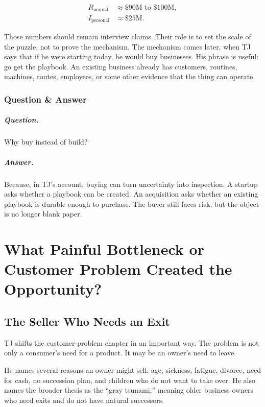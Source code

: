 \documentclass[11pt,oneside]{book}
\begin{document}
\begin{align}
R_{\mathrm{annual}} &\approx \$90\mathrm{M}\text{ to }\$100\mathrm{M},\\
I_{\mathrm{personal}} &\approx \$25\mathrm{M}.
\end{align}

Those numbers should remain interview claims. Their role is to set the scale of the puzzle, not to prove the mechanism. The mechanism comes later, when TJ says that if he were starting today, he would buy businesses. His phrase is useful: go get the playbook. An existing business already has customers, routines, machines, routes, employees, or some other evidence that the thing can operate.

\subsection{Question \& Answer}

\paragraph{Question.}
Why buy instead of build?

\paragraph{Answer.}
Because, in TJ's account, buying can turn uncertainty into inspection. A startup asks whether a playbook can be created. An acquisition asks whether an existing playbook is durable enough to purchase. The buyer still faces risk, but the object is no longer blank paper.

\chapter{What Painful Bottleneck or Customer Problem Created the Opportunity?}

\section{The Seller Who Needs an Exit}

TJ shifts the customer-problem chapter in an important way. The problem is not only a consumer's need for a product. It may be an owner's need to leave.

He names several reasons an owner might sell: age, sickness, fatigue, divorce, need for cash, no succession plan, and children who do not want to take over. He also names the broader thesis as the ``gray tsunami,'' meaning older business owners who need exits and do not have natural successors.
\end{document}
